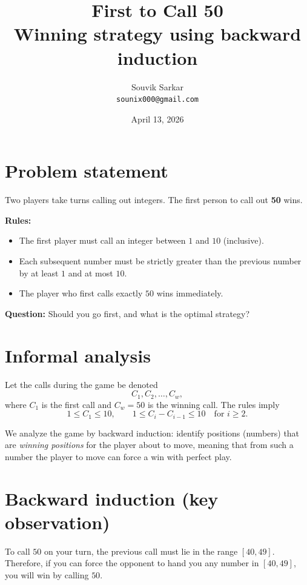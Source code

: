 \documentclass[11pt]{article}
\title{\bfseries First to Call 50\\[4pt] \large Winning strategy using backward induction}
\author{Souvik Sarkar \\ \texttt{sounix000@gmail.com}}
\date{April 13, 2026}
\begin{document}
\maketitle

\section*{Problem statement}

\begin{tcolorbox}[mybox, title=Game setup]
Two players take turns calling out integers. The first person to call out \textbf{50} wins.

\medskip
\textbf{Rules:}
\begin{itemize}
  \item The first player must call an integer between $1$ and $10$ (inclusive).
  \item Each subsequent number must be strictly greater than the previous number by at least $1$ and at most $10$.
  \item The player who first calls exactly $50$ wins immediately.
\end{itemize}

\noindent\textbf{Question:} Should you go first, and what is the optimal strategy?
\end{tcolorbox}

\section*{Informal analysis}

Let the calls during the game be denoted
\[
C_1, C_2, \dots, C_w,
\]
where $C_1$ is the first call and $C_w = 50$ is the winning call. The rules imply
\[
1 \le C_1 \le 10,\qquad
1 \le C_i - C_{i-1} \le 10 \quad\text{for } i\ge 2.
\]

We analyze the game by backward induction: identify positions (numbers) that are \emph{winning positions} for the player about to move, meaning that from such a number the player to move can force a win with perfect play.

\section*{Backward induction (key observation)}

To call $50$ on your turn, the previous call must lie in the range $[40,49]$. Therefore, if you can force the opponent to hand you any number in $[40,49]$, you will win by calling $50$.
\end{document}
